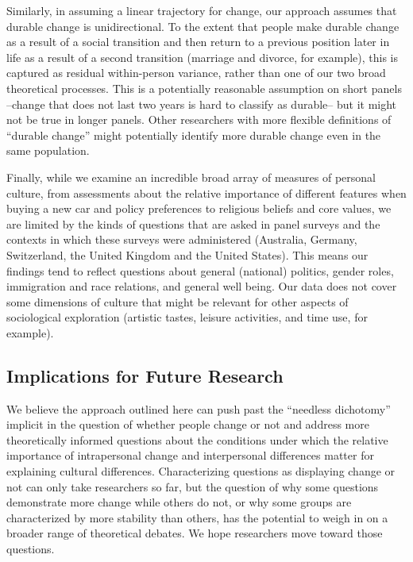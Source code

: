 \documentclass[
  11pt,
]{article}
\begin{document}
Similarly, in assuming a linear trajectory for change, our approach
assumes that durable change is unidirectional. To the extent that people
make durable change as a result of a social transition and then return
to a previous position later in life as a result of a second transition
(marriage and divorce, for example), this is captured as residual
within-person variance, rather than one of our two broad theoretical
processes. This is a potentially reasonable assumption on short panels
--change that does not last two years is hard to classify as durable--
but it might not be true in longer panels. Other researchers with more
flexible definitions of ``durable change'' might potentially identify
more durable change even in the same population.

Finally, while we examine an incredible broad array of measures of
personal culture, from assessments about the relative importance of
different features when buying a new car and policy preferences to
religious beliefs and core values, we are limited by the kinds of
questions that are asked in panel surveys and the contexts in which
these surveys were administered (Australia, Germany, Switzerland, the
United Kingdom and the United States). This means our findings tend to
reflect questions about general (national) politics, gender roles,
immigration and race relations, and general well being. Our data does
not cover some dimensions of culture that might be relevant for other
aspects of sociological exploration (artistic tastes, leisure
activities, and time use, for example).

\hypertarget{implications-for-future-research}{%
\subsection{Implications for Future
Research}\label{implications-for-future-research}}

We believe the approach outlined here can push past the ``needless
dichotomy'' implicit in the question of whether people change or not and
address more theoretically informed questions about the conditions under
which the relative importance of intrapersonal change and interpersonal
differences matter for explaining cultural differences. Characterizing
questions as displaying change or not can only take researchers so far,
but the question of why some questions demonstrate more change while
others do not, or why some groups are characterized by more stability
than others, has the potential to weigh in on a broader range of
theoretical debates. We hope researchers move toward those questions.
\end{document}
